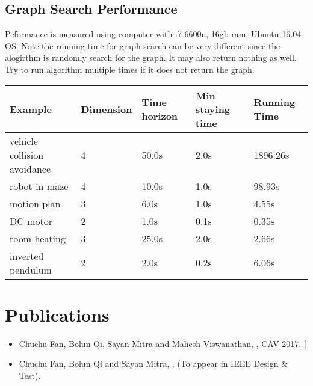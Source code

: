 \documentclass[letterpaper,10pt,english]{sphinxmanual}
\begin{document}
\section{Graph Search Performance}
\label{\detokenize{example:graph-search-performance}}
Peformance is measured using computer with i7 6600u, 16gb ram, Ubuntu 16.04 OS.
Note the running time for graph search can be very different since the alogirthm is randomly search for the graph. It may also return nothing as well. Try to run algorithm multiple times if it does not return the graph.

\noindent\begin{tabulary}{\linewidth}{|L|L|L|L|L|}
\hline

Example
&
Dimension
&
Time horizon
&
Min staying time
&
Running Time
\\
\hline
vehicle collision avoidance
&
4
&
50.0s
&
2.0s
&
1896.26s
\\
\hline
robot in maze
&
4
&
10.0s
&
1.0s
&
98.93s
\\
\hline
motion plan
&
3
&
6.0s
&
1.0s
&
4.55s
\\
\hline
DC motor
&
2
&
1.0s
&
0.1s
&
0.35s
\\
\hline
room heating
&
3
&
25.0s
&
2.0s
&
2.66s
\\
\hline
inverted pendulum
&
2
&
2.0s
&
0.2s
&
6.06s
\\
\hline\end{tabulary}



\chapter{Publications}
\label{\detokenize{publications::doc}}\label{\detokenize{publications:publications}}\begin{itemize}
\item {} 
Chuchu Fan, Bolun Qi, Sayan Mitra and Mahesh Viswanathan, , CAV 2017. {[}\sphinxhref{https://www.youtube.com/watch?v=9j7KcbZx6m0}{Video}{]}

\item {} 
Chuchu Fan, Bolun Qi and Sayan Mitra, , (To appear in IEEE Design \& Test).

\end{itemize}
\end{document}
